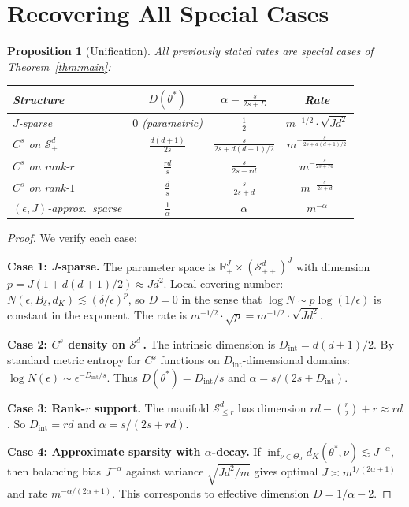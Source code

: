 \documentclass[11pt]{article}
\newtheorem{proposition}[theorem]{Proposition}
\theoremstyle{definition}
\newcommand{\R}{\mathbb{R}}
\newcommand{\Splus}{\mathcal{S}_+^d}
\newcommand{\Splusplus}{\mathcal{S}_{++}^d}
\begin{document}
\section{Recovering All Special Cases}

\begin{proposition}[Unification]
All previously stated rates are special cases of Theorem~\ref{thm:main}:

\begin{center}
\renewcommand{\arraystretch}{1.6}
\begin{tabular}{|l|c|c|c|}
\hline
\textbf{Structure} & $D(\theta^*)$ & $\alpha = \frac{s}{2s + D}$ & \textbf{Rate} \\
\hline\hline
$J$-sparse & $0$ (parametric) & $\frac{1}{2}$ & $m^{-1/2} \cdot \sqrt{Jd^2}$ \\
\hline
$C^s$ on $\Splus$ & $\frac{d(d+1)}{2s}$ & $\frac{s}{2s + d(d+1)/2}$ & $m^{-\frac{s}{2s + d(d+1)/2}}$ \\
\hline
$C^s$ on rank-$r$ & $\frac{rd}{s}$ & $\frac{s}{2s + rd}$ & $m^{-\frac{s}{2s + rd}}$ \\
\hline
$C^s$ on rank-$1$ & $\frac{d}{s}$ & $\frac{s}{2s + d}$ & $m^{-\frac{s}{2s + d}}$ \\
\hline
$(\epsilon, J)$-approx.\ sparse & $\frac{1}{\alpha}$ & $\alpha$ & $m^{-\alpha}$ \\
\hline
\end{tabular}
\end{center}
\end{proposition}

\begin{proof}
We verify each case:

\textbf{Case 1: $J$-sparse.} The parameter space is $\R^J_+ \times (\Splusplus)^J$ with dimension $p = J(1 + d(d+1)/2) \approx Jd^2$. Local covering number: $N(\epsilon, B_\delta, d_K) \lesssim (\delta/\epsilon)^p$, so $D = 0$ in the sense that $\log N \sim p \log(1/\epsilon)$ is constant in the exponent. The rate is $m^{-1/2} \cdot \sqrt{p} = m^{-1/2} \cdot \sqrt{Jd^2}$.

\textbf{Case 2: $C^s$ density on $\Splus$.} The intrinsic dimension is $D_{\mathrm{int}} = d(d+1)/2$. By standard metric entropy for $C^s$ functions on $D_{\mathrm{int}}$-dimensional domains: $\log N(\epsilon) \sim \epsilon^{-D_{\mathrm{int}}/s}$. Thus $D(\theta^*) = D_{\mathrm{int}}/s$ and $\alpha = s/(2s + D_{\mathrm{int}})$.

\textbf{Case 3: Rank-$r$ support.} The manifold $\mathcal{S}_{\leq r}^d$ has dimension $rd - \binom{r}{2} + r \approx rd$. So $D_{\mathrm{int}} = rd$ and $\alpha = s/(2s + rd)$.

\textbf{Case 4: Approximate sparsity with $\alpha$-decay.} If $\inf_{\nu \in \Theta_J} d_K(\theta^*, \nu) \lesssim J^{-\alpha}$, then balancing bias $J^{-\alpha}$ against variance $\sqrt{Jd^2/m}$ gives optimal $J \asymp m^{1/(2\alpha+1)}$ and rate $m^{-\alpha/(2\alpha+1)}$. This corresponds to effective dimension $D = 1/\alpha - 2$.
\end{proof}
\end{document}
